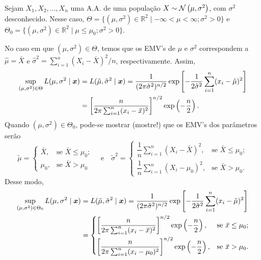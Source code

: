 \begin{theorem}
Sejam $X_1,X_2,\ldots,X_n$ uma A.A. de uma população $X\sim\normdist{\mu,\sigma^2}$, com $\sigma^2$ desconhecido. Nesse caso, $\Theta=\{(\mu,\sigma^2)\in\mathbb{R}^2\mid-\infty<\mu<\infty;\sigma^2>0\}$ e $\Theta_0=\{(\mu,\sigma^2)\in\mathbb{R}^2\mid\mu\leq\mu_0;\sigma^2>0\}$.

No caso em que $(\mu,\sigma^2)\in\Theta$, temos que os EMV's de $\mu$ e $\sigma^2$ correspondem a $\hat{\mu}=\bar{X}$ e $\hat{\sigma}^2=\sum_{i=1}^n(X_i-\bar{X})^2/n$, respectivamente. Assim,
\begin{align}
\sup_{(\mu,\sigma^2)\in\Theta}L(\mu,\sigma^2\mid\bm{x}) &= L(\hat{\mu},\hat{\sigma}^2\mid\bm{x}) = \frac{1}{(2\pi\hat{\sigma}^2)^{n/2}}\exp\left[-\frac{1}{2\hat{\sigma}^2}\sum_{i=1}^n(x_i-\hat{\mu})^2\right]\notag\\
&= \left[\frac{n}{2\pi\sum_{i=1}^n(x_i-\,\overline{\!{x}})^2}\right]^{n/2}\exp\left(-\frac{n}{2}\right).
\end{align}
Quando $(\mu,\sigma^2)\in\Theta_0$, pode-se mostrar (mostre!) que os EMV's dos parâmetros serão
\begin{equation}
\tilde{\mu} = \begin{cases}
\bar{X}, & \text{se } \bar{X}\leq\mu_0;\\
\mu_0, & \text{se } \bar{X}>\mu_0
\end{cases}
\quad \text{e} \quad
\tilde{\sigma}^2 = \begin{cases}
\dfrac{1}{n}\sum_{i=1}^n\left(X_i-\bar{X}\right)^2, & \text{se } \bar{X}\leq\mu_0;\\
\dfrac{1}{n}\sum_{i=1}^n(X_i-\mu_0)^2, & \text{se } \bar{X}>\mu_0.
\end{cases}
\end{equation}
Desse modo,
\begin{align}
\sup_{(\mu,\sigma^2)\in\Theta_0}L(\mu,\sigma^2\mid\bm{x}) &= L(\tilde{\mu},\tilde{\sigma}^2\mid\bm{x}) = \frac{1}{(2\pi\tilde{\sigma}^2)^{n/2}}\exp\left[-\frac{1}{2\tilde{\sigma}^2}\sum_{i=1}^n(x_i-\tilde{\mu})^2\right]\notag\\
&= \begin{cases}
\left[\dfrac{n}{2\pi\sum_{i=1}^n(x_i-\,\overline{\!{x}})^2}\right]^{n/2}\exp\left(-\dfrac{n}{2}\right), & \text{se } \,\overline{\!{x}}\leq\mu_0;\\[2ex]
\left[\dfrac{n}{2\pi\sum_{i=1}^n(x_i-\mu_0)^2}\right]^{n/2}\exp\left(-\dfrac{n}{2}\right), & \text{se } \,\overline{\!{x}}>\mu_0.

\end{cases}
\end{align}
\end{theorem}

